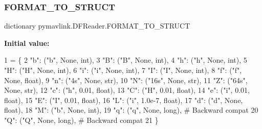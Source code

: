\subsubsection{\texorpdfstring{F\+O\+R\+M\+A\+T\+\_\+\+T\+O\+\_\+\+S\+T\+R\+U\+CT}{FORMAT\_TO\_STRUCT}}
{\footnotesize\ttfamily dictionary pymavlink.\+D\+F\+Reader.\+F\+O\+R\+M\+A\+T\+\_\+\+T\+O\+\_\+\+S\+T\+R\+U\+CT}

{\bfseries Initial value\+:}
\begin{DoxyCode}
1 =  \{
2     \textcolor{stringliteral}{"b"}: (\textcolor{stringliteral}{"b"}, \textcolor{keywordtype}{None}, int),
3     \textcolor{stringliteral}{"B"}: (\textcolor{stringliteral}{"B"}, \textcolor{keywordtype}{None}, int),
4     \textcolor{stringliteral}{"h"}: (\textcolor{stringliteral}{"h"}, \textcolor{keywordtype}{None}, int),
5     \textcolor{stringliteral}{"H"}: (\textcolor{stringliteral}{"H"}, \textcolor{keywordtype}{None}, int),
6     \textcolor{stringliteral}{"i"}: (\textcolor{stringliteral}{"i"}, \textcolor{keywordtype}{None}, int),
7     \textcolor{stringliteral}{"I"}: (\textcolor{stringliteral}{"I"}, \textcolor{keywordtype}{None}, int),
8     \textcolor{stringliteral}{"f"}: (\textcolor{stringliteral}{"f"}, \textcolor{keywordtype}{None}, float),
9     \textcolor{stringliteral}{"n"}: (\textcolor{stringliteral}{"4s"}, \textcolor{keywordtype}{None}, str),
10     \textcolor{stringliteral}{"N"}: (\textcolor{stringliteral}{"16s"}, \textcolor{keywordtype}{None}, str),
11     \textcolor{stringliteral}{"Z"}: (\textcolor{stringliteral}{"64s"}, \textcolor{keywordtype}{None}, str),
12     \textcolor{stringliteral}{"c"}: (\textcolor{stringliteral}{"h"}, 0.01, float),
13     \textcolor{stringliteral}{"C"}: (\textcolor{stringliteral}{"H"}, 0.01, float),
14     \textcolor{stringliteral}{"e"}: (\textcolor{stringliteral}{"i"}, 0.01, float),
15     \textcolor{stringliteral}{"E"}: (\textcolor{stringliteral}{"I"}, 0.01, float),
16     \textcolor{stringliteral}{"L"}: (\textcolor{stringliteral}{"i"}, 1.0e-7, float),
17     \textcolor{stringliteral}{"d"}: (\textcolor{stringliteral}{"d"}, \textcolor{keywordtype}{None}, float),
18     \textcolor{stringliteral}{"M"}: (\textcolor{stringliteral}{"b"}, \textcolor{keywordtype}{None}, int),
19     \textcolor{stringliteral}{"q"}: (\textcolor{stringliteral}{"q"}, \textcolor{keywordtype}{None}, long),  \textcolor{comment}{# Backward compat}
20     \textcolor{stringliteral}{"Q"}: (\textcolor{stringliteral}{"Q"}, \textcolor{keywordtype}{None}, long),  \textcolor{comment}{# Backward compat}
21     \}
\end{DoxyCode}
